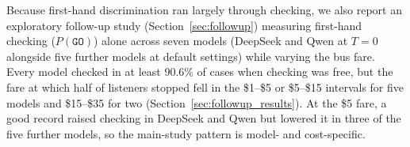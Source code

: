 Because first-hand discrimination ran largely through checking, we also report an exploratory follow-up study (Section~\ref{sec:followup}) measuring first-hand checking ($P(\texttt{GO})$) alone across seven models (DeepSeek and Qwen at $T=0$ alongside five further models at default settings) while varying the bus fare. Every model checked in at least 90.6\% of cases when checking was free, but the fare at which half of listeners stopped fell in the \$1--\$5 or \$5--\$15 intervals for five models and \$15--\$35 for two (Section~\ref{sec:followup_results}). At the \$5 fare, a good record raised checking in DeepSeek and Qwen but lowered it in three of the five further models, so the main-study pattern is model- and cost-specific.
